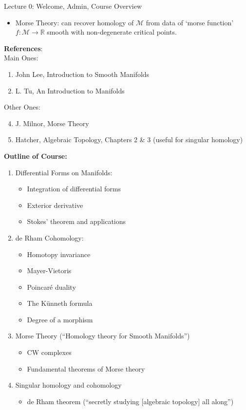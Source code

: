 \documentclass[10pt]{article}
\theoremstyle{plain}
\theoremstyle{definition}
\newcommand{\Real}{\mathbb{R}}
\newcommand{\man}{\mathcal{M}}
\begin{document}
\begin{section}{Lecture 0: Welcome, Admin, Course Overview}
\begin{enumerate}
\begin{itemize}
        \item Morse Theory: can recover homology of $\man$ from data of `morse function' $f : \man \to \Real$ smooth with non-degenerate critical points.
    \end{itemize}
\end{enumerate}
\textbf{References}:\\
Main Ones:
\begin{enumerate}
    \item John Lee, Introduction to Smooth Manifolds
    \item L. Tu, An Introduction to Manifolds
\end{enumerate}
Other Ones:
\begin{enumerate}
  \setcounter{enumi}{3}
    \item J. Milnor, Morse Theory
    \item Hatcher, Algebraic Topology, Chapters 2 \& 3 (useful for singular homology)
\end{enumerate}
\noindent
\textbf{Outline of Course:}
\begin{enumerate}
    \item Differential Forms on Manifolds:
    \begin{itemize}
        \item Integration of differential forms
        \item Exterior derivative
        \item Stokes' theorem and applications
    \end{itemize}
    \item de Rham Cohomology:
    \begin{itemize}
        \item Homotopy invariance
        \item Mayer-Vietoris
        \item Poincar\'e duality
        \item The Künneth formula
        \item Degree of a morphism
    \end{itemize}
    \item Morse Theory (``Homology theory for Smooth Manifolds'')
    \begin{itemize}
        \item CW complexes
        \item Fundamental theorems of Morse theory
    \end{itemize}
    \item Singular homology and cohomology
    \begin{itemize}
        \item de Rham theorem (``secretly studying [algebraic topology] all along'')
    \end{itemize}
\end{enumerate}
\end{section}
\end{document}
